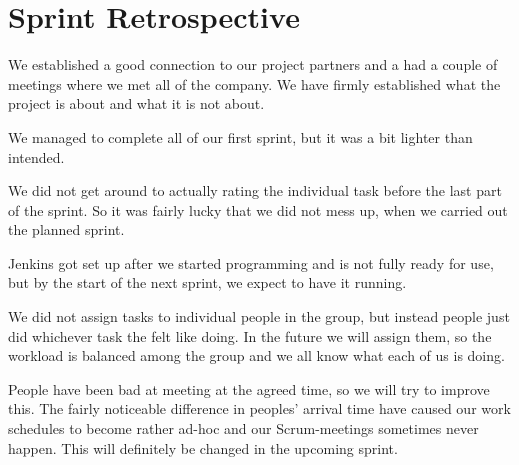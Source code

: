 \section{Sprint Retrospective}

We established a good connection to our project partners and a had a
couple of meetings where we met all of the company. We have firmly
established what the project is about and what it is not about. 

We managed to complete all of our first sprint, but it was a bit
lighter than intended.

We did not get around to actually rating the individual task before the
last part of the sprint. So it was fairly lucky that we did not mess up,
when we carried out the planned sprint. 

Jenkins got set up after we started programming and is not fully ready
for use, but by the start of the next sprint, we expect to have it
running.

We did not assign tasks to individual people in the group, but instead
people just did whichever task the felt like doing. In the future we will
assign them, so the workload is balanced among the group and we all know
what each of us is doing.

People have been bad at meeting at the agreed time, so we will try to
improve this. The fairly noticeable difference in peoples' arrival
time have caused our work schedules to become rather ad-hoc and our
Scrum-meetings sometimes never happen. This will definitely be changed in
the upcoming sprint.





